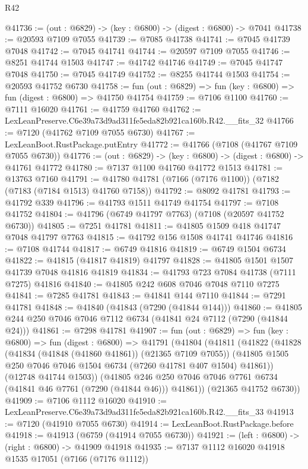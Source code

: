 \begin{lexlean}{R42}
\begin{coremodule}
{@41736 := (out : @6829) -> (key : @6800) -> (digest : @6800) -> @7041
@41738 := @20593 @7109 @7055
@41739 := @7085 @41738
@41741 := @7045 @41739 @7048
@41742 := @7045 @41741
@41744 := @20597 @7109 @7055
@41746 := @8251 @41744 @1503
@41747 := @41742 @41746
@41749 := @7045 @41747 @7048
@41750 := @7045 @41749
@41752 := @8255 @41744 @1503
@41754 := @20593 @41752 @6730
@41758 := fun (out : @6829) => fun (key : @6800) => fun (digest : @6800) => @41750 @41754
@41759 := @7106 @1100
@41760 := @7111 @16020
@41761 := @41759 @41760
@41762 := LexLeanPreserve.C6e39a73d9ad311fe5eda82b921ca160b.R42.__fits_32
@41766 := @7120 (@41762 @7109 @7055 @6730)
@41767 := LexLeanBoot.RustPackage.putEntry
@41772 := @41766 (@7108 (@41767 @7109 @7055 @6730))
@41776 := (out : @6829) -> (key : @6800) -> (digest : @6800) -> @41761 @41772
@41780 := @7137 @1100 @41760 @41772 @1513
@41781 := @13763 @7160
@41791 := @41780 @41781 (@7166 (@7176 @1100)) (@7182 (@7183 (@7184 @1513) @41760 @7158))
@41792 := @8092 @41781
@41793 := @41792 @339
@41796 := @41793 @1511 @41749 @41754
@41797 := @7108 @41752
@41804 := @41796 (@6749 @41797 @7763) (@7108 (@20597 @41752 @6730))
@41805 := @7251 @41781
@41811 := @41805 @1509 @418 @41747 @7048 @41797 @7763
@41815 := @41792 @156 @1508 @41741 @41746
@41816 := @7108 @41744
@41817 := @6749 @41816
@41819 := @6749 @1504 @6734
@41822 := @41815 (@41817 @41819) @41797
@41828 := @41805 @1501 @1507 @41739 @7048 @41816 @41819
@41834 := @41793 @723 @7084 @41738 (@7111 @7275) @41816
@41840 := @41805 @242 @608 @7046 @7048 @7110 @7275
@41841 := @7285 @41781
@41843 := @41841 @144 @7110
@41844 := @7291 @41781
@41848 := @41840 (@41843 (@7290 (@41844 @144)))
@41860 := @41805 @244 @250 @7046 @7046 @7112 @6734 (@41841 @24 @7112 (@7290 (@41844 @24)))
@41861 := @7298 @41781
@41907 := fun (out : @6829) =>
  fun (key : @6800) =>
  fun (digest : @6800) =>
  @41791
    (@41804
      (@41811
        (@41822
          (@41828
            (@41834 (@41848 (@41860 @41861)) (@21365 @7109 @7055))
            (@41805 @1505 @250 @7046 @7046 @1504 @6734 (@7260 @41781 @407 @1504) @41861))
          (@12748 @41744 @1503))
        (@41805 @246 @250 @7046 @7046 @7761 @6734 (@41841 @46 @7761 (@7290 (@41844 @46))) @41861))
      (@21365 @41752 @6730))
@41909 := @7106 @1112 @16020
@41910 := LexLeanPreserve.C6e39a73d9ad311fe5eda82b921ca160b.R42.__fits_33
@41913 := @7120 (@41910 @7055 @6730)
@41914 := LexLeanBoot.RustPackage.before
@41918 := @41913 (@6759 (@41914 @7055 @6730))
@41921 := (left : @6800) -> (right : @6800) -> @41909 @41918
@41935 := @7137
    @1112
    @16020
    @41918
    @1535
    @17051
    (@7166 (@7176 @1112))
}
\end{coremodule}
\end{lexlean}
